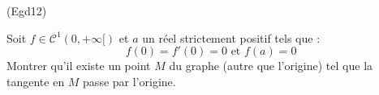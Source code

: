 \begin{tiny}(Egd12)\end{tiny}
Soit $f\in \mathcal C^1(0,+\infty[)$ et $a$ un réel strictement positif tels que :
\begin{displaymath}
 f(0) =f'(0)=0 \text{ et } f(a) = 0
\end{displaymath}
Montrer qu'il existe un point $M$ du graphe (autre que l'origine) tel que la tangente en $M$ passe par l'origine.